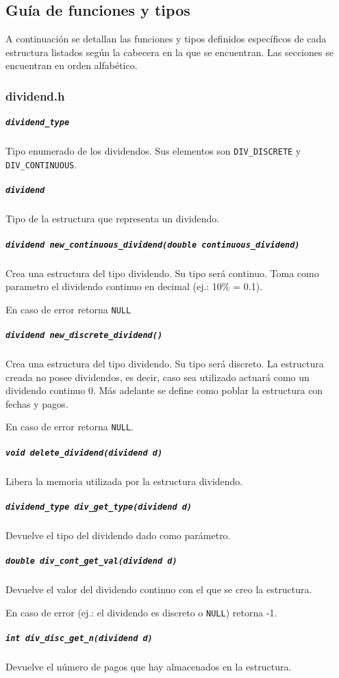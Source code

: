 \documentclass[12pt,a4paper,final]{article}
\begin{document}
	\subsection{Guía de funciones y tipos}
		A continuación se detallan las funciones y tipos definidos específicos de cada estructura
		listados según la cabecera en la que se encuentran. Las secciones se encuentran en orden alfabético.
		
		\subsubsection{dividend.h}
		
			\subparagraph{\texttt{dividend\_type}}
				Tipo enumerado de los dividendos. Sus elementos son
				\texttt{DIV\_DISCRETE} y \texttt{DIV\_CONTINUOUS}.
			
			\subparagraph{\texttt{dividend}}
				Tipo de la estructura que representa un dividendo.
				
			\subparagraph{\texttt{dividend new\_continuous\_dividend(double continuous\_dividend)}}
				Crea una estructura del tipo dividendo. Su tipo será continuo.
				Toma como parametro el dividendo continuo en decimal (ej.: 10\% = 0.1).
					
				En caso de error retorna \texttt{NULL}
				
			\subparagraph{\texttt{dividend new\_discrete\_dividend()}}
				Crea una estructura del tipo dividendo. Su tipo será discreto.
				La estructura creada no posee dividendos, es decir, caso sea utilizado
				actuará como un dividendo continuo 0. Más adelante se define como poblar
				la estructura con fechas y pagos.
					
				En caso de error retorna \texttt{NULL}.
				
			\subparagraph{\texttt{void delete\_dividend(dividend d)}}
				Libera la memoria utilizada por la estructura dividendo.
				
			\subparagraph{\texttt{dividend\_type div\_get\_type(dividend d)}}
				Devuelve el tipo del dividendo dado como parámetro.
				
			\subparagraph{\texttt{double div\_cont\_get\_val(dividend d)}}
				Devuelve el valor del dividendo continuo con el que se creo la estructura.
					
				En caso de error (ej.: el dividendo es discreto o \texttt{NULL}) retorna -1.
				
			\subparagraph{\texttt{int div\_disc\_get\_n(dividend d)}}
			
				Devuelve el número de pagos que hay almacenados en la estructura.
					
\end{document}
